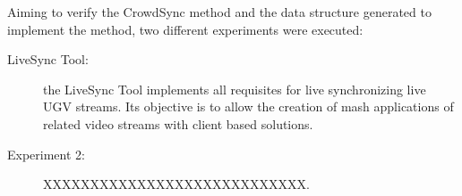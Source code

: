 Aiming to verify the CrowdSync method and the data structure generated to implement the method, two different experiments were executed:

\begin{description}
	\item[LiveSync Tool:] the LiveSync Tool implements all requisites for live synchronizing live UGV streams. Its objective is to allow the creation of mash applications of related video streams with client based solutions.
\end{description}

\begin{description}
	\item[Experiment 2:] XXXXXXXXXXXXXXXXXXXXXXXXXXXX.
\end{description}



